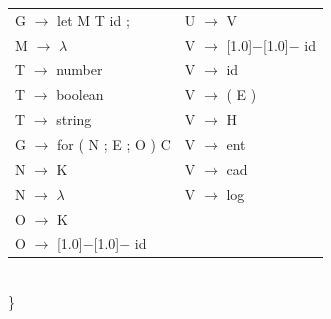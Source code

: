 \documentclass[11pt, , a4paper, titlepage]{article}
\newcommand{\minus}{\scalebox{0.75}[1.0]{$-$}}
\begin{document}
\begin{tabular}{ l l }
    G $\rightarrow$ let M T id ;            & U $\rightarrow$ V                              \\
    M $\rightarrow$ $\lambda$               & V $\rightarrow$ \minus\minus \hspace{0.1cm} id \\
    T $\rightarrow$ number                  & V $\rightarrow$ id                             \\
    T $\rightarrow$ boolean                 & V $\rightarrow$ ( E )                          \\
    T $\rightarrow$ string                  & V $\rightarrow$ H                              \\
    G $\rightarrow$ for ( N ; E ; O ) { C } & V $\rightarrow$ ent                            \\
    N $\rightarrow$ K                       & V $\rightarrow$ cad                            \\
    N $\rightarrow$ $\lambda$               & V $\rightarrow$ log                            \\
    O $\rightarrow$ K                                                                        \\
    O $\rightarrow$ \minus\minus \hspace{0.1cm} id
\end{tabular}
\setlength{\tabcolsep}{0.5cm}
\\\}
\clearpage
\end{document}
